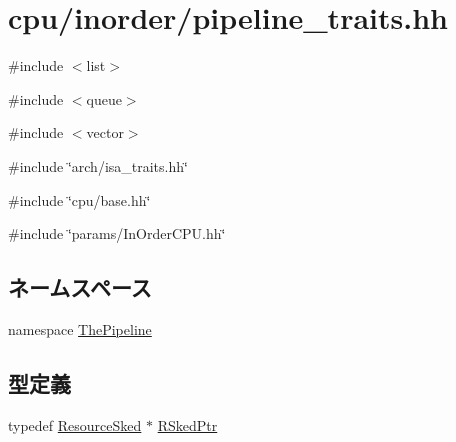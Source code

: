 \hypertarget{pipeline__traits_8hh}{
\section{cpu/inorder/pipeline\_\-traits.hh}
\label{pipeline__traits_8hh}
}
{\ttfamily \#include $<$list$>$}\par
{\ttfamily \#include $<$queue$>$}\par
{\ttfamily \#include $<$vector$>$}\par
{\ttfamily \#include \char`\"{}arch/isa\_\-traits.hh\char`\"{}}\par
{\ttfamily \#include \char`\"{}cpu/base.hh\char`\"{}}\par
{\ttfamily \#include \char`\"{}params/InOrderCPU.hh\char`\"{}}\par
\subsection*{ネームスペース}
\begin{DoxyCompactItemize}
\item 
namespace \hyperlink{namespaceThePipeline}{ThePipeline}
\end{DoxyCompactItemize}
\subsection*{型定義}
\begin{DoxyCompactItemize}
\item 
typedef \hyperlink{classResourceSked}{ResourceSked} $\ast$ \hyperlink{namespaceThePipeline_a3c31767e98b29d5b17248f4c92fec587}{RSkedPtr}
\end{DoxyCompactItemize}
